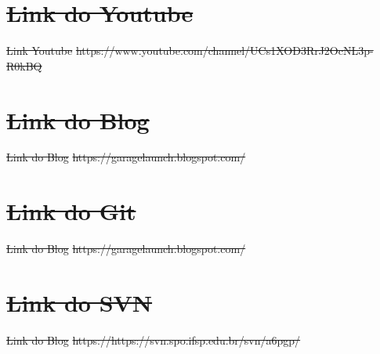 \documentclass[
    12pt,               %
    openright,          %
    oneside,
    a4paper,            %
    paginasA3,  %
    BIBLATEX,           %
    REFINDENT,          %
    MODELO,             %
    TODO,               %
    english,            %
    brazil              %
    ]{ifsp-spo-inf-ctds} %
\providecommand{\DIFdel}[1]{{\protect\color{red}\sout{#1}}}                      %
\providecommand{\DIFdelFL}[1]{\DIFdel{#1}} %
\begin{document}
\begin{apendicesenv}
\section{\DIFdelFL{Link do Youtube}}
\addtocounter{section}{-1}%
\DIFdelFL{Link Youtube}%
\DIFdelFL{https://www.youtube.com/channel/UCs1XOD3RrJ2OcNL3p-R0kBQ}%

\section{\DIFdelFL{Link do Blog}}
\addtocounter{section}{-1}%
\DIFdelFL{Link do Blog}%
\DIFdelFL{https://garagelaunch.blogspot.com/}%

\section{\DIFdelFL{Link do Git}}
\addtocounter{section}{-1}%
\DIFdelFL{Link do Blog}%
\DIFdelFL{https://garagelaunch.blogspot.com/}%

\section{\DIFdelFL{Link do SVN}}
\addtocounter{section}{-1}%
\DIFdelFL{Link do Blog}%
\DIFdelFL{https://https://svn.spo.ifsp.edu.br/svn/a6pgp/}%


\end{apendicesenv}
\end{document}
